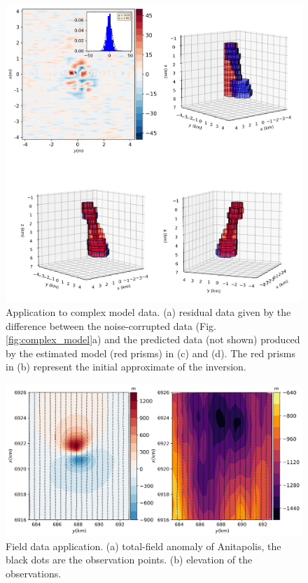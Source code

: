 \begin{figure}
    \centering
    \includegraphics[scale=.5]{figures/complex_results.png}
    \caption{Application to complex model data. (a) residual data given by the difference between the noise-corrupted data (Fig. \ref{fig:complex_model}a) and the predicted data (not shown) produced by the estimated model (red prisms) in (c) and (d). The red prisms in (b) represent the initial approximate of the inversion.
}
    \label{fig:complex_result}
\end{figure}


\begin{figure}
    \centering
    \includegraphics[scale=.5]{figures/anitapolis_data_alt.png}
    \caption{Field data application. (a) total-field anomaly of Anitapolis, the black dots are the observation points. (b) elevation of the observations.
}
    \label{fig:real_data}
\end{figure}

